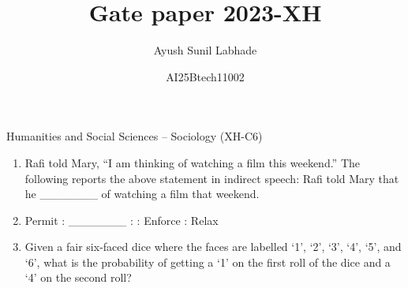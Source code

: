 \documentclass[12pt]{article}
\theoremstyle{remark}
\begin{document}
\title{\vspace{-5cm}Gate paper 2023-XH}
\author{Ayush Sunil Labhade}
\date{AI25Btech11002}
\maketitle

\begin{flushright}Humanities and Social Sciences – Sociology (XH-C6)\end{flushright}
\begin{enumerate}
\item Rafi told Mary, “I am thinking of watching a film this weekend.”
The following reports the above statement in indirect speech: 
Rafi told Mary that he \_\_\_\_\_\_\_ of watching a film that weekend.
\begin{enumerate}
\end{enumerate}
\hfill{}
\item Permit : \_\_\_\_\_\_\_ : : Enforce : Relax 
\begin{enumerate}
\end{enumerate}
\hfill{}
\item Given a fair six-faced dice where the faces are labelled ‘1’, ‘2’, ‘3’, ‘4’, ‘5’, and ‘6’, 
what is the probability of getting a ‘1’ on the first roll of the dice and a ‘4’ on the 
second roll?
\begin{enumerate}
    \begin{multicols}{4}

\end{multicols}
\end{enumerate}
\end{enumerate}
\end{document}
